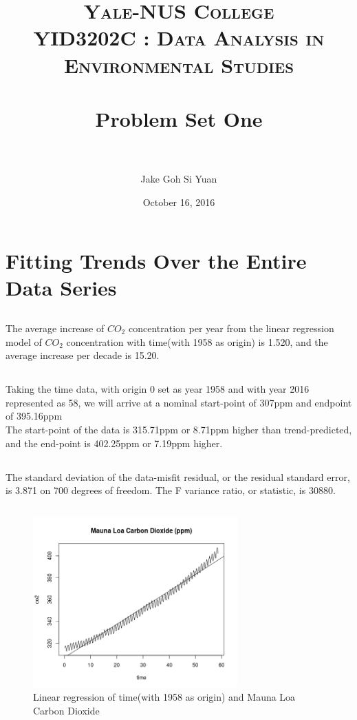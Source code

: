 \documentclass[paper=a4, fontsize=11pt]{scrartcl}
\title{	
\normalfont \normalsize 
\textsc{Yale-NUS College} \\ [20pt]
\textsc{YID3202C : Data Analysis in Environmental Studies } \\ [25pt] %
\horrule{0.5pt} \\[0.4cm] %
\huge Problem Set One \\ %
\horrule{2pt} \\[0.5cm] %
}
\author{Jake Goh Si Yuan} %
\date{\normalsize October 16, 2016} %
\numberwithin{equation}{section} %
\numberwithin{figure}{section} %
\numberwithin{table}{section} %
\begin{document}
\maketitle %
\section{Fitting Trends Over the Entire Data Series}
\subsection{}
The average increase of $CO_2$ concentration per year from the linear regression model of $CO_2$ concentration with time(with 1958 as origin) is 1.520, and the average increase per decade is 15.20.

\subsection{}
Taking the time data, with origin 0 set as year 1958 and with year 2016 represented as 58, we will arrive at a nominal start-point of 307ppm and endpoint of 395.16ppm\\

The start-point of the data is 315.71ppm or 8.71ppm higher than trend-predicted, and the end-point is 402.25ppm or 7.19ppm higher.
\subsection{}

The standard deviation of the data-misfit residual, or the residual standard error, is 3.871 on 700 degrees of freedom. The F variance ratio, or statistic, is 30880.
\pagebreak
\subsection{}
\begin{figure}[htp]
	\centering
	\includegraphics[width=0.7\textwidth, clip]{q1aTime.png} 
	\caption{Linear regression of time(with 1958 as origin) and Mauna Loa Carbon Dioxide}
\end{figure}
\end{document}
